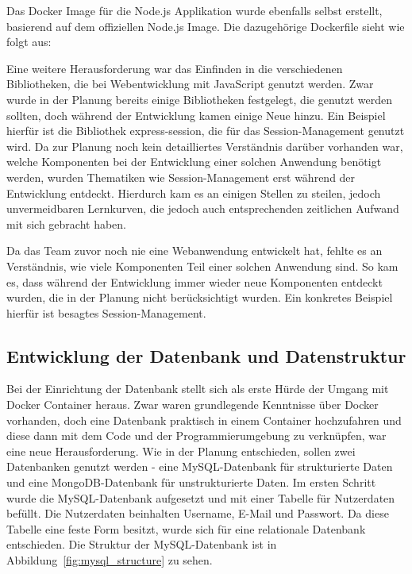 \vspace{1em}

\vspace{1em}

Das Docker Image für die Node.js Applikation wurde ebenfalls selbst erstellt, basierend auf dem offiziellen Node.js Image.
Die dazugehörige Dockerfile sieht wie folgt aus:

\vspace{1em}

\vspace{1em}

Eine weitere Herausforderung war das Einfinden in die verschiedenen Bibliotheken, die bei Webentwicklung mit JavaScript genutzt werden.
Zwar wurde in der Planung bereits einige Bibliotheken festgelegt, die genutzt werden sollten, doch während der Entwicklung kamen einige Neue hinzu.
Ein Beispiel hierfür ist die Bibliothek express-session, die für das Session-Management genutzt wird.
Da zur Planung noch kein detailliertes Verständnis darüber vorhanden war, welche Komponenten bei der Entwicklung einer solchen Anwendung benötigt werden, wurden Thematiken wie Session-Management erst während der Entwicklung entdeckt.
Hierdurch kam es an einigen Stellen zu steilen, jedoch unvermeidbaren Lernkurven, die jedoch auch entsprechenden zeitlichen Aufwand mit sich gebracht haben.

Da das Team zuvor noch nie eine Webanwendung entwickelt hat, fehlte es an Verständnis, wie viele Komponenten Teil einer solchen Anwendung sind.
So kam es, dass während der Entwicklung immer wieder neue Komponenten entdeckt wurden, die in der Planung nicht berücksichtigt wurden.
Ein konkretes Beispiel hierfür ist besagtes Session-Management.

\subsection{Entwicklung der Datenbank und Datenstruktur}\label{subsec:entwicklung-der-datenbank-und-datenstruktur}

Bei der Einrichtung der Datenbank stellt sich als erste Hürde der Umgang mit Docker Container heraus.
Zwar waren grundlegende Kenntnisse über Docker vorhanden, doch eine Datenbank praktisch in einem Container hochzufahren und diese dann mit dem Code und der Programmierumgebung zu verknüpfen, war eine neue Herausforderung.
Wie in der Planung entschieden, sollen zwei Datenbanken genutzt werden - eine MySQL-Datenbank für strukturierte Daten und eine MongoDB-Datenbank für unstrukturierte Daten.
Im ersten Schritt wurde die MySQL-Datenbank aufgesetzt und mit einer Tabelle für Nutzerdaten befüllt.
Die Nutzerdaten beinhalten Username, E-Mail und Passwort.
Da diese Tabelle eine feste Form besitzt, wurde sich für eine relationale Datenbank entschieden.
Die Struktur der MySQL-Datenbank ist in Abbildung~\ref{fig:mysql_structure} zu sehen.


